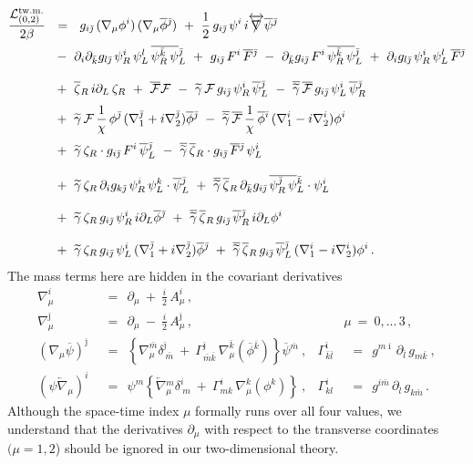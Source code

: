 \documentclass[12pt]{article}
\newcommand{\p}{\partial}
\newcommand{\wt}{\widetilde}
\newcommand{\ov}{\overline}
\newcommand{\mc}[1]{\mathcal{#1}}
\def\slashed#1{\setbox0=\hbox{$#1$}             %
   \dimen0=\wd0                                 %
   \setbox1=\hbox{/} \dimen1=\wd1               %
   \ifdim\dimen0>\dimen1                        %
      \rlap{\hbox to \dimen0{\hfil/\hfil}}      %
      #1                                        %
   \else                                        %
      \rlap{\hbox to \dimen1{\hfil$#1$\hfil}}   %
      /                                         %
   \fi}                                        %
\newcommand{\bzr}{\ov{\zeta}{}_R}
\newcommand{\zr}{\zeta_R}
\newcommand{\tgamma}{\wt{\gamma}}
\newcommand{\btgamma}{\ov{\tgamma}}
\newcommand{\bpsi}{\ov{\psi}{}}
\newcommand{\bphi}{\ov{\phi}{}}
\newcommand{\ff}{\mc{F}}
\newcommand{\bff}{\ov{\mc{F}}}
\newcommand{\bi}{{\bar \imath}}
\newcommand{\bj}{{\bar \jmath}}
\newcommand{\bk}{{\bar k}}
\newcommand{\bl}{{\bar l}}
\newcommand{\bm}{{\bar m}}
\begin{document}
\begin{align}
%
\notag
	\frac{\mc{L}_{(0,2)}^\text{tw.m.}}{2\beta} & ~~=~~ 
	g_{i\bj}\,(\nabla_\mu \phi^i)\, (\nabla_\mu\ov{\phi}{}^\bj)
	~+~ \frac{1}{2}\, g_{i\bj}\, \psi^i\, i\overleftrightarrow{\slashed{\nabla}} \ov{\psi}{}^\bj
	\\
%
\notag
	&~
	~-~ \p_i\p_\bk g_{l\bj}\, \psi^i_{R}\, \psi^l_{L}\, \ov{\psi^\bk_{R}\, \psi}{}^\bj_{L}
	~+~ g_{i\bj}\, F^i\,\ov{F}{}^\bj
	~-~ \p_\bk g_{i\bj}\, F^i\, \ov{\psi_R^\bk\, \psi}{}_L^\bj
	~+~ \p_i g_{l\bj}\, \psi_R^i\, \psi_L^l\, \ov{F}{}^\bj
	\\[3mm]
%
\notag
	&~
	~+~ \bzr\, i\p_L\, \zr ~+~ \bff \ff 
	~-~ \tgamma\, \ff\, g_{i\bj}\, \psi_R^i\, \bpsi_L^\bj 
	~-~ \btgamma\, \bff\, g_{i\bj}\, \psi_L^i\, \bpsi_R^\bj
	\\[1mm]
%
\label{geomlin}
	&~
	~+~ \tgamma\, \ff\, \frac{1}{\chi}\,\phi^\bj\, (\nabla_1^\bj + i \nabla_2^\bj) \bphi^\bj
	~-~ \btgamma\, \bff\, \frac{1}{\chi}\,\bphi^\bi\, (\nabla_1^i - i \nabla_2^i) \phi^i
	\\[1mm]
%
\notag
	&~
	~+~ \tgamma\,\zr\cdot g_{i\bj}\, F^i\, \bpsi_L^\bj
	~-~ \btgamma\, \bzr\cdot g_{i\bj}\, \ov{F}{}^\bj\, \psi_L^i
	\\[3mm]
%
\notag
	&~
	~+~ \tgamma\, \zr\, \p_i g_{k\bj}\, \psi_R^i\, \psi_L^k \cdot \bpsi_L^\bj
	~+~ \btgamma\, \bzr\, \p_\bk g_{i\bj}\, \ov{\psi_R^\bj\, \psi}{}_L^\bk \cdot \psi_L^i
	\\[3mm]
%	
\notag
	&~
	~+~ \tgamma\, \zr\, g_{i\bj}\, \psi_R^i\, i\p_L \bphi^\bj
	~+~ \btgamma\, \bzr\, g_{i\bj}\, \bpsi_R^\bj\, i\p_L \phi^i
	\\[3mm]
%
\notag
	&~
	~+~ \tgamma\, \zr\, g_{i\bj}\, \psi_L^i\, (\nabla_1^\bj + i\nabla_2^\bj) \bphi^\bj
	~+~ \btgamma\, \bzr\, g_{i\bj}\, \bpsi_L^\bj\, (\nabla_1^i - i\nabla_2^i) \phi^i
	\,.
\end{align}
	The mass terms here are hidden in the covariant derivatives
\begin{align*}
%
	\nabla_\mu^i & ~~=~~ \p_\mu ~+~ \frac{i}{2}\,A_\mu^i\,,  \\[3mm]
%
	\nabla_\mu^\bj & ~~=~~ \p_\mu ~-~ \frac{i}{2}\,A_\mu^\bj \,,
	&& \!\!\!\!\!\!\! \mu ~=~ 0,...\,3\,,
	\\[3mm]
%
	(\nabla_\mu \ov{\psi})^\bj & ~~=~~ \left\{ \nabla_\mu^\bm \delta^\bj_{\ \bm} ~+~
						\Gamma_{\bm\bk}^\bj\, \nabla_\mu^\bk (\ov{\phi}{}^\bk) \right\} \ov{\psi}{}^\bm~,
	& \Gamma^\bi_{\bk\bl} & ~~=~~ g^{m\bi}\,\p_\bl\, g_{m\bk}~,
	\\[3mm]
%
	(\psi \overleftarrow{\nabla}{}_\mu)^i & ~~=~~ 
			\psi^m \left\{ \overleftarrow{\nabla}{}_\mu^m \delta^i_{\ m} ~+~
						\Gamma^i_{mk}\, \nabla_\mu^k (\phi^k) \right\}~,
	& \Gamma^i_{kl} & ~~=~~ g^{i\bm}\, \p_l\, g_{k\bm}\,.
\end{align*}
	Although the space-time index $\mu$ formally runs over all four values, we understand
	that the derivatives $ \p_\mu $ with respect to the transverse coordinates 
	$(\mu=1,2$) should be ignored in our two-dimensional
	theory.
\end{document}
